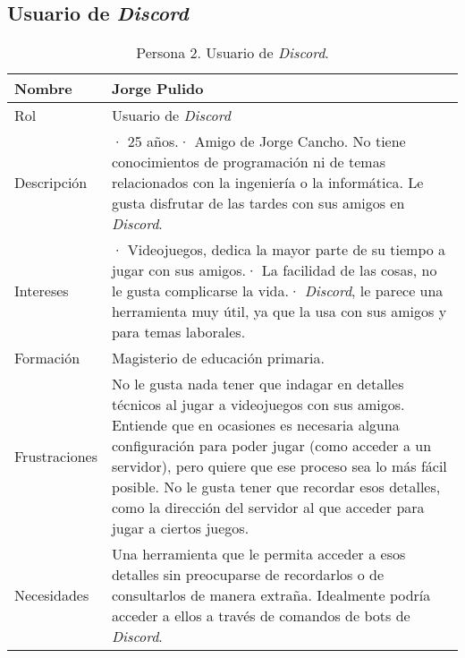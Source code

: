 \subsection{Usuario de \textit{Discord}}
\label{sec:personaUsuarioDiscord}
\begin{table}[H]
    \centering
    \def\arraystretch{1.25}
    \begin{adjustbox}{max width=\textwidth}
    \begin{tabularx}{\textwidth}{|l|L|}
    \hline
        \textbf{Nombre} & \textbf{Jorge Pulido} \\ \hline
    \hline
        Rol & Usuario de \textit{Discord} \\ \hline
        Descripción & · 25 años.\linebreak · Amigo de Jorge Cancho. No tiene conocimientos de programación ni de temas relacionados con la ingeniería o la informática. Le gusta disfrutar de las tardes con sus amigos en \textit{Discord}. \\ \hline
        Intereses & · Videojuegos, dedica la mayor parte de su tiempo a jugar con sus amigos.\linebreak · La facilidad de las cosas, no le gusta complicarse la vida.\linebreak · \textit{Discord}, le parece una herramienta muy útil, ya que la usa con sus amigos y para temas laborales. \\ \hline
        Formación & Magisterio de educación primaria. \\ \hline
        Frustraciones & No le gusta nada tener que indagar en detalles técnicos al jugar a videojuegos con sus amigos. Entiende que en ocasiones es necesaria alguna configuración para poder jugar (como acceder a un servidor), pero quiere que ese proceso sea lo más fácil posible. No le gusta tener que recordar esos detalles, como la dirección del servidor al que acceder para jugar a ciertos juegos. \\ \hline
        Necesidades & Una herramienta que le permita acceder a esos detalles sin preocuparse de recordarlos o de consultarlos de manera extraña. Idealmente podría acceder a ellos a través de comandos de bots de \textit{Discord}. \\ \hline
    \end{tabularx}
    \end{adjustbox}
    \caption{Persona 2. Usuario de \textit{Discord}.}
\end{table}

